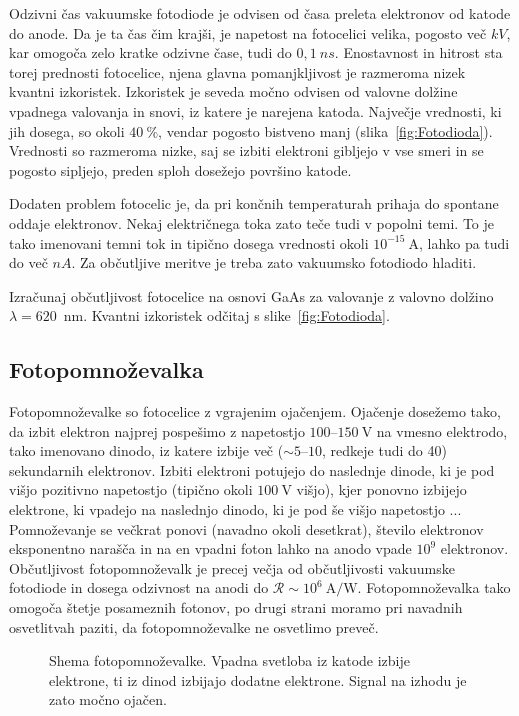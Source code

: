 Odzivni čas vakuumske fotodiode je odvisen od časa preleta elektronov od katode do anode. 
Da je ta čas čim krajši, je napetost na fotocelici velika, pogosto več $\si{kV}$,
kar omogoča zelo kratke odzivne čase, tudi do $0,1~\si{ns}$. 
Enostavnost in hitrost sta torej prednosti fotocelice, 
njena glavna pomanjkljivost je razmeroma nizek kvantni izkoristek. 
Izkoristek je seveda močno odvisen od valovne dolžine vpadnega valovanja in snovi, iz 
katere je narejena katoda. Največje vrednosti, ki jih dosega, so okoli $40~\%$, vendar
pogosto bistveno manj (slika~\ref{fig:Fotodioda}). 
Vrednosti so razmeroma nizke, saj se izbiti elektroni gibljejo v vse
smeri in se pogosto sipljejo, preden sploh dosežejo površino katode. 

Dodaten problem fotocelic je, da pri končnih temperaturah prihaja do spontane oddaje elektronov.
Nekaj električnega toka zato teče tudi v popolni temi. To je tako imenovani temni 
tok 
in tipično dosega vrednosti okoli $10^{-15}~\si{\ampere}$, lahko pa tudi do več $\si{nA}$. 
Za občutljive meritve je treba zato vakuumsko fotodiodo hladiti. 

\vskip1cm
\begin{definition}
Izračunaj občutljivost fotocelice na osnovi GaAs 
za valovanje z valovno dolžino $\lambda=620$~nm.
Kvantni izkoristek odčitaj s slike~\ref{fig:Fotodioda}.
\end{definition}

\subsection*{Fotopomnoževalka}
Fotopomnoževalke so fotocelice z vgrajenim ojačenjem. Ojačenje dosežemo tako, da 
izbit elektron najprej pospešimo z napetostjo $100$--$150~\si{\volt}$ na vmesno elektrodo, 
tako imenovano dinodo, iz katere izbije več ($\sim 5$--$10$, redkeje tudi do 40) 
sekundarnih elektronov. Izbiti elektroni 
potujejo do naslednje dinode, ki je pod višjo pozitivno napetostjo (tipično okoli $100~\si{\volt}$
višjo), kjer ponovno izbijejo elektrone, ki vpadejo na naslednjo dinodo, 
ki je pod še višjo napetostjo ... 
Pomnoževanje se večkrat ponovi (navadno okoli desetkrat),
število elektronov eksponentno narašča in na en vpadni foton lahko na anodo vpade $10^9$ elektronov. 
Občutljivost fotopomnoževalk je  precej večja od občutljivosti vakuumske fotodiode in
dosega odzivnost na anodi do $\mathcal{R}\sim 10^6~\si{\ampere/\watt}$.
Fotopomnoževalka tako omogoča štetje posameznih fotonov, po drugi strani moramo pri 
navadnih osvetlitvah paziti, da fotopomnoževalke ne osvetlimo preveč. 
\begin{figure}[h]
\centering
\def\svgwidth{80truemm} 

\caption{Shema fotopomnoževalke. Vpadna svetloba iz katode izbije elektrone, ti 
iz dinod izbijajo dodatne elektrone. Signal na izhodu je zato močno ojačen. }
\label{fig:PMT}
\end{figure}

